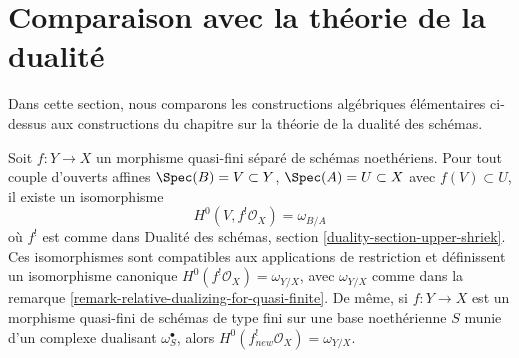 \section{Comparaison avec la théorie de la dualité}
\label{section-comparison}

\noindent
Dans cette section, nous comparons les constructions algébriques élémentaires
ci-dessus aux constructions du chapitre sur la théorie de la dualité
des schémas.

\begin{lemma}
\label{lemma-compare-dualizing}
Soit $f : Y \to X$ un morphisme quasi-fini séparé de schémas noethériens.
Pour tout couple d'ouverts affines $\Spec(B) = V \subset Y$,
$\Spec(A) = U \subset X$ avec $f(V) \subset U$, il existe un isomorphisme
$$
H^0(V, f^!\mathcal{O}_X) = \omega_{B/A}
$$
où $f^!$ est comme dans
Dualité des schémas, section \ref{duality-section-upper-shriek}.
Ces isomorphismes sont compatibles aux applications de restriction et définissent un
isomorphisme canonique $H^0(f^!\mathcal{O}_X) = \omega_{Y/X}$, avec
$\omega_{Y/X}$ comme dans la remarque \ref{remark-relative-dualizing-for-quasi-finite}.
De même, si $f : Y \to X$ est un morphisme quasi-fini de schémas de
type fini sur une base noethérienne $S$ munie d'un complexe dualisant
$\omega_S^\bullet$, alors $H^0(f_{new}^!\mathcal{O}_X) = \omega_{Y/X}$.
\end{lemma}

